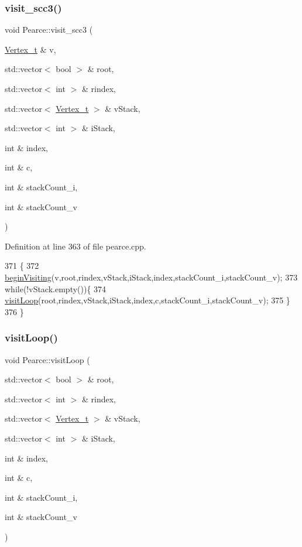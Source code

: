 \subsubsection{\texorpdfstring{visit\+\_\+scc3()}{visit\_scc3()}}
{\footnotesize\ttfamily void Pearce\+::visit\+\_\+scc3 (\begin{DoxyParamCaption}\item[{\hyperlink{class_graph_component_ae67114a6ce5a001dc35e1996e1b45aa0}{Vertex\+\_\+t} \&}]{v,  }\item[{std\+::vector$<$ bool $>$ \&}]{root,  }\item[{std\+::vector$<$ int $>$ \&}]{rindex,  }\item[{std\+::vector$<$ \hyperlink{class_graph_component_ae67114a6ce5a001dc35e1996e1b45aa0}{Vertex\+\_\+t} $>$ \&}]{v\+Stack,  }\item[{std\+::vector$<$ int $>$ \&}]{i\+Stack,  }\item[{int \&}]{index,  }\item[{int \&}]{c,  }\item[{int \&}]{stack\+Count\+\_\+i,  }\item[{int \&}]{stack\+Count\+\_\+v }\end{DoxyParamCaption})}



Definition at line 363 of file pearce.\+cpp.


\begin{DoxyCode}
371                                            \{
372     \hyperlink{class_pearce_ab9090eeb4466701bc8ba913d8f9f5b50}{beginVisiting}(v,root,rindex,vStack,iStack,index,stackCount\_i,stackCount\_v);
373     \textcolor{keywordflow}{while}(!vStack.empty())\{
374         \hyperlink{class_pearce_a323fc3337d5849680065986d6ef7163c}{visitLoop}(root,rindex,vStack,iStack,index,c,stackCount\_i,stackCount\_v);
375     \}
376 \}
\end{DoxyCode}
\mbox{\label{class_pearce_a323fc3337d5849680065986d6ef7163c}} 
\subsubsection{\texorpdfstring{visit\+Loop()}{visitLoop()}}
{\footnotesize\ttfamily void Pearce\+::visit\+Loop (\begin{DoxyParamCaption}\item[{std\+::vector$<$ bool $>$ \&}]{root,  }\item[{std\+::vector$<$ int $>$ \&}]{rindex,  }\item[{std\+::vector$<$ \hyperlink{class_graph_component_ae67114a6ce5a001dc35e1996e1b45aa0}{Vertex\+\_\+t} $>$ \&}]{v\+Stack,  }\item[{std\+::vector$<$ int $>$ \&}]{i\+Stack,  }\item[{int \&}]{index,  }\item[{int \&}]{c,  }\item[{int \&}]{stack\+Count\+\_\+i,  }\item[{int \&}]{stack\+Count\+\_\+v }\end{DoxyParamCaption})}



